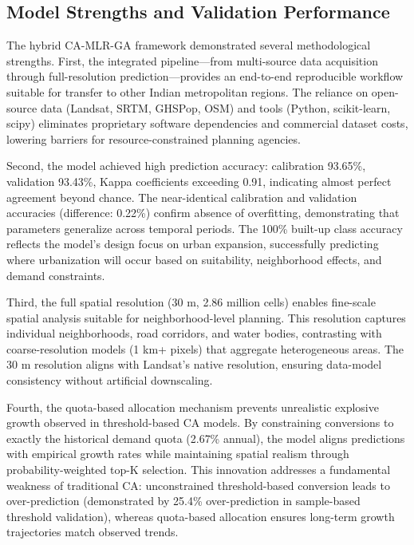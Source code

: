 \documentclass[conference]{IEEEtran}
\begin{document}
\subsection{Model Strengths and Validation Performance}

The hybrid CA-MLR-GA framework demonstrated several methodological strengths. First, the integrated pipeline—from multi-source data acquisition through full-resolution prediction—provides an end-to-end reproducible workflow suitable for transfer to other Indian metropolitan regions. The reliance on open-source data (Landsat, SRTM, GHSPop, OSM) and tools (Python, scikit-learn, scipy) eliminates proprietary software dependencies and commercial dataset costs, lowering barriers for resource-constrained planning agencies.

Second, the model achieved high prediction accuracy: calibration 93.65\%, validation 93.43\%, Kappa coefficients exceeding 0.91, indicating almost perfect agreement beyond chance. The near-identical calibration and validation accuracies (difference: 0.22\%) confirm absence of overfitting, demonstrating that parameters generalize across temporal periods. The 100\% built-up class accuracy reflects the model's design focus on urban expansion, successfully predicting where urbanization will occur based on suitability, neighborhood effects, and demand constraints.

Third, the full spatial resolution (30 m, 2.86 million cells) enables fine-scale spatial analysis suitable for neighborhood-level planning. This resolution captures individual neighborhoods, road corridors, and water bodies, contrasting with coarse-resolution models (1 km+ pixels) that aggregate heterogeneous areas. The 30 m resolution aligns with Landsat's native resolution, ensuring data-model consistency without artificial downscaling.

Fourth, the quota-based allocation mechanism prevents unrealistic explosive growth observed in threshold-based CA models. By constraining conversions to exactly the historical demand quota (2.67\% annual), the model aligns predictions with empirical growth rates while maintaining spatial realism through probability-weighted top-K selection. This innovation addresses a fundamental weakness of traditional CA: unconstrained threshold-based conversion leads to over-prediction (demonstrated by 25.4\% over-prediction in sample-based threshold validation), whereas quota-based allocation ensures long-term growth trajectories match observed trends.
\end{document}
